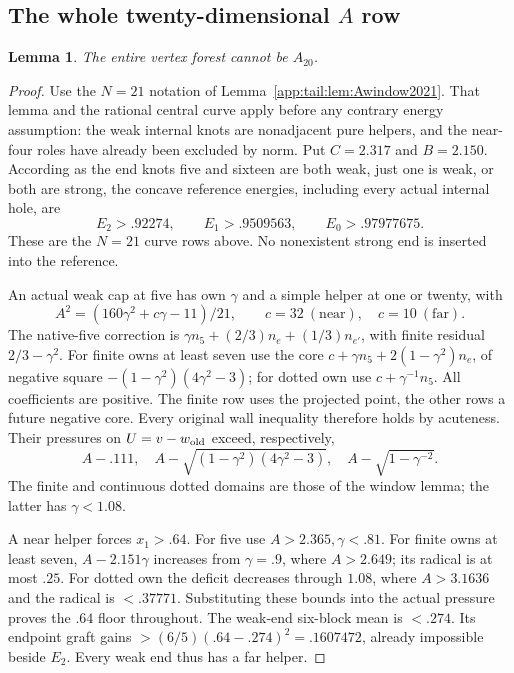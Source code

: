 \documentclass[11pt]{article}
\newtheorem{lemma}[theorem]{Lemma}
\theoremstyle{definition}
\theoremstyle{remark}
\begin{document}
\subsection[The whole twenty-dimensional A row]{The whole twenty-dimensional $A$ row}
\begin{lemma}\label{app:tail:lem:wholeA20}
The entire vertex forest cannot be $A_{20}$.
\end{lemma}
\begin{proof}
Use the $N=21$ notation of Lemma~\ref{app:tail:lem:Awindow2021}.
That lemma and the rational central curve apply before any contrary
energy assumption: the weak internal knots are nonadjacent pure
helpers, and the near-four roles have already been excluded by norm.
Put $C=2.317$ and $B=2.150$. According as the end knots five and
sixteen are both weak, just one is weak, or both are strong, the
concave reference energies, including every actual internal hole, are
\[
 E_2>.92274,\qquad E_1>.9509563,\qquad E_0>.97977675.
\]
These are the $N=21$ curve rows above. No nonexistent strong end
is inserted into the reference.

An actual weak cap at five has own $\gamma$ and a simple helper
at one or twenty, with
\[
 A^2=(160\gamma^2+c\gamma-11)/21,
 \qquad c=32\ (\text{near}),\quad c=10\ (\text{far}).
\]
The native-five correction is
$\gamma n_5+(2/3)n_e+(1/3)n_{e'}$, with finite residual
$2/3-\gamma^2$. For finite owns at least seven use the core
$c+\gamma n_5+2(1-\gamma^2)n_e$, of negative square
$-(1-\gamma^2)(4\gamma^2-3)$; for dotted own use
$c+\gamma^{-1}n_5$. All coefficients are positive.
The finite row uses the projected point, the other rows a future
negative core. Every original wall inequality therefore holds by
acuteness. Their pressures on $U=v-w_{\rm old}$ exceed, respectively,
\[
 A-.111,\quad A-\sqrt{(1-\gamma^2)(4\gamma^2-3)},\quad
 A-\sqrt{1-\gamma^{-2}}.
\]
The finite and continuous dotted domains are those of the window
lemma; the latter has $\gamma<1.08$.

A near helper forces $x_1>.64$. For five use $A>2.365,\gamma<.81$.
For finite owns at least seven, $A-2.151\gamma$ increases from
$\gamma=.9$, where $A>2.649$; its radical is at most $.25$.
For dotted own the deficit decreases through $1.08$, where
$A>3.1636$ and the radical is $<.37771$.
Substituting these bounds into the actual pressure proves the
$.64$ floor throughout. The weak-end six-block mean is $<.274$.
Its endpoint graft gains $>(6/5)(.64-.274)^2=.1607472$, already
impossible beside $E_2$. Every weak end thus has a far helper.


\end{proof}
\end{document}

